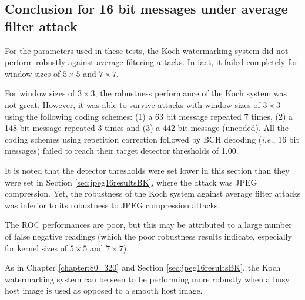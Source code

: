 \documentclass[12pt]{report}
\begin{document}

\subsection{Conclusion for 16 bit messages under average filter attack}
\label{sec:avfilt16resultsConcBK}
For the parameters used in these tests, the Koch watermarking system did not perform robustly against
average filtering attacks. 
In fact, it failed completely for window sizes of $5\times 5$ and $7\times 7$. 

For window sizes of $3\times 3$, the robustness performance of the Koch system was not great. 
However, it was 
able to survive attacks with window sizes of $3\times 3$ using the following coding schemes:
(1) a 63 bit message repeated 7 times,
(2) a 148 bit message repeated 3 times and
(3) a 442 bit message (uncoded).
All the coding schemes using repetition correction followed by BCH decoding (\emph{i.e.}, 16 bit messages)
failed to reach their target 
detector thresholds of 1.00.

It is noted that the detector thresholds were set lower in this section than they were set in
Section \ref{sec:jpeg16resultsBK}, where the attack was JPEG compression. Yet, the robustness
of the Koch system against average filter attacks was inferior to its robustness
to JPEG compression attacks.

The ROC performances are poor, but this may be attributed to a large number of false negative
readings (which the poor robustness results indicate, especially for kernel sizes of $5\times 5$ and $7\times 7$).

As in Chapter \ref{chapter:80_320}
and 
Section \ref{sec:jpeg16resultsBK},
the Koch watermarking system can be seen to be performing more robustly
when a busy host image is used as opposed to a smooth host image.
\end{document}
